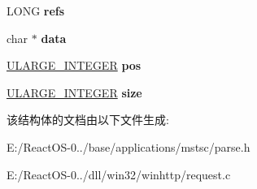 \begin{DoxyCompactItemize}
\item 
\mbox{\label{structstream_a67bea587722c19f6809a6f5a8f51a99f}} 
L\+O\+NG {\bfseries refs}
\item 
\mbox{\label{structstream_a37cf8e805bedc0466e6e007d173d69cf}} 
char $\ast$ {\bfseries data}
\item 
\mbox{\label{structstream_a6ce9399ad6599037d462bf6cf54a940f}} 
\hyperlink{struct___u_l_a_r_g_e___i_n_t_e_g_e_r}{U\+L\+A\+R\+G\+E\+\_\+\+I\+N\+T\+E\+G\+ER} {\bfseries pos}
\item 
\mbox{\label{structstream_ade84e3fd2d6f39835f733d1167c41956}} 
\hyperlink{struct___u_l_a_r_g_e___i_n_t_e_g_e_r}{U\+L\+A\+R\+G\+E\+\_\+\+I\+N\+T\+E\+G\+ER} {\bfseries size}
\end{DoxyCompactItemize}


该结构体的文档由以下文件生成\+:\begin{DoxyCompactItemize}
\item 
E\+:/\+React\+O\+S-\/0../base/applications/mstsc/parse.\+h\item 
E\+:/\+React\+O\+S-\/0../dll/win32/winhttp/request.\+c\end{DoxyCompactItemize}
